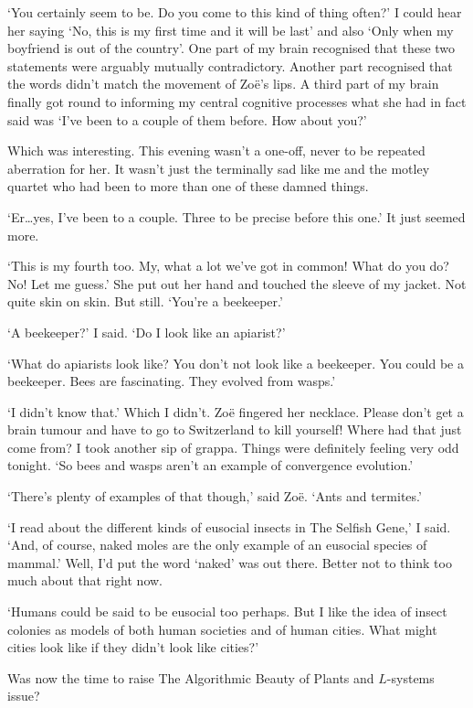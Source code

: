 `You certainly seem to be. Do you come to this kind of thing often?'
I could hear her saying `No, this is my first time and it will be
last' and also `Only when my boyfriend is out
of the country'. One part of my brain recognised that these two
statements were arguably mutually contradictory. Another part recognised that the words
didn't match the movement of Zoë's lips. A third part of my brain finally got round to
informing my central cognitive processes what she had in fact said was `I've been to a couple of them before. How about you?'

Which was interesting. This evening wasn't a one-off, never to be
repeated aberration for her. It wasn't just the terminally sad like me and the
motley quartet who had been to more than one of these damned things.

`Er\dots yes, I've been to a couple. Three to be precise before this
one.' It just seemed more.

`This is my fourth too. My, what a lot we've got in common! What do
you do? No! Let me guess.' She put out her hand and touched the sleeve of my jacket. Not quite skin on skin. But still. `You're a beekeeper.'

`A beekeeper?' I said. `Do I look like an apiarist?'

`What do apiarists look like? You don't {\twelveit not\/} look like a beekeeper. You could be a beekeeper. Bees are fascinating. They evolved from wasps.'

`I didn't know that.' Which I didn't. Zoë fingered her necklace. Please don't get a brain tumour and have to go to Switzerland to kill yourself! Where had {\twelveit that\/} just come from? I took another sip of grappa. Things were definitely feeling very odd tonight. `So bees and wasps aren't an example of convergence evolution.'

`There's plenty of examples of that though,' said Zoë. `Ants and termites.'

`I read about the different kinds of eusocial insects in {\twelvesl The Selfish Gene},' I said. `And, of course, naked moles are the only example of an eusocial species of mammal.' Well, I'd put the word `naked' was out there. Better not to think too much about that right now.

`Humans could be said to be eusocial too perhaps. But I like the idea of insect colonies as models of both human societies and of human cities. What might cities look like if they didn't look like cities?'

Was now the time to raise {\twelvesl The Algorithmic Beauty of Plants} and $L$-systems issue?

